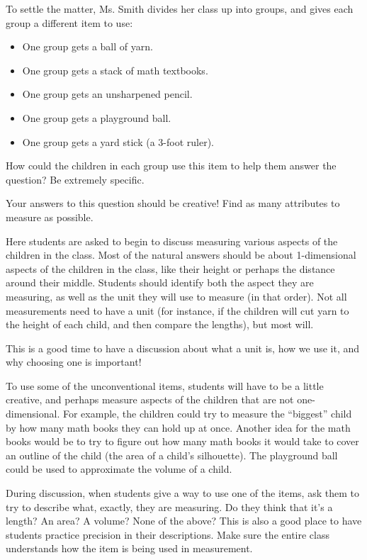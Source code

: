 \documentclass[]{ximera}
\begin{document}
\begin{problem}
    To settle the matter, Ms. Smith divides her class up into groups, and gives each group a different item to use:
    \begin{itemize}
        \item One group gets a ball of yarn.
        \item One group gets a stack of math textbooks.
        \item One group gets an unsharpened pencil.
        \item One group gets a playground ball.
        \item One group gets a yard stick (a 3-foot ruler).
    \end{itemize}
    
    How could the children in each group use this item to help them answer the question?  Be extremely specific.
    
    \begin{solution}
    Your answers to this question should be creative!  Find as many attributes to measure as possible.
    \end{solution}
    
    \begin{instructorNotes}
        Here students are asked to begin to discuss measuring various aspects of the children in the class.  Most of the natural answers should be about 1-dimensional aspects of the children in the class, like their height or perhaps the distance around their middle.  Students should identify both the aspect they are measuring, as well as the unit they will use to measure (in that order).  Not all measurements need to have a unit (for instance, if the children will cut yarn to the height of each child, and then compare the lengths), but most will.  
        
        This is a good time to have a discussion about what a unit is, how we use it, and why choosing one is important!
        
        To use some of the unconventional items, students will have to be a little creative, and perhaps measure aspects of the children that are not one-dimensional.  For example, the children could try to measure the ``biggest'' child by how many math books they can hold up at once.  Another idea for the math books would be to try to figure out how many math books it would take to cover an outline of the child (the area of a child's silhouette).  The playground ball could be used to approximate the volume of a child.
        
        During discussion, when students give a way to use one of the items, ask them to try to describe what, exactly, they are measuring.  Do they think that it's a length?  An area?  A volume?  None of the above?  This is also a good place to have students practice precision in their descriptions.  Make sure the entire class understands how the item is being used in measurement.
    \end{instructorNotes}
\end{problem}
\end{document}
